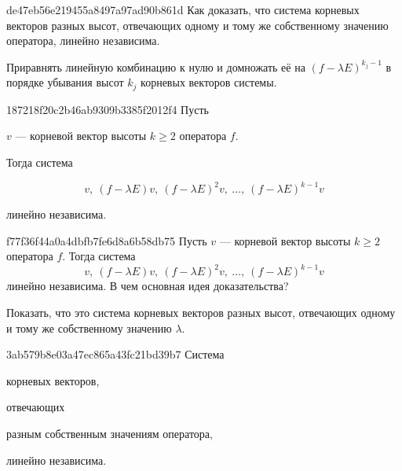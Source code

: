 \begin{note}{de47eb56e219455a8497a97ad90b861d}
    Как доказать, что система корневых векторов разных высот, отвечающих одному и тому же собственному значению оператора, линейно независима.

    \begin{cloze}{1}
        Приравнять линейную комбинацию к нулю и домножать её на \( (f - \lambda E)^{k_j - 1} \) в порядке убывания высот \( k_j \) корневых векторов системы.
    \end{cloze}
\end{note}

\begin{note}{187218f20c2b46ab9309b3385f2012f4}
    Пусть \begin{icloze}{3}\( v \) --- корневой вектор высоты \( k \geqslant 2 \) оператора \( f \).\end{icloze}
    Тогда система
    \begin{icloze}{2}
        \[
            v,\: (f - \lambda E) v,\: (f - \lambda E)^{2} v,\: \ldots,\: (f - \lambda E)^{k - 1} v
        \]
    \end{icloze}
    \begin{icloze}{1}линейно независима.\end{icloze}
\end{note}

\begin{note}{f77f36f44a0a4dbfb7fe6d8a6b58db75}
    Пусть \( v \) --- корневой вектор высоты \( k \geqslant 2 \) оператора \( f \).
    Тогда система
    \[
        v,\: (f - \lambda E) v,\: (f - \lambda E)^{2} v,\: \ldots,\: (f - \lambda E)^{k - 1} v
    \]
    линейно независима.
    В чем основная идея доказательства?

    \begin{cloze}{1}
        Показать, что это система корневых векторов разных высот, отвечающих одному и тому же собственному значению \( \lambda \).
    \end{cloze}
\end{note}

\begin{note}{3ab579b8e03a47ec865a43fc21bd39b7}
    Система \begin{icloze}{3}корневых векторов,\end{icloze} отвечающих \begin{icloze}{2}разным собственным значениям оператора,\end{icloze} \begin{icloze}{1}линейно независима.\end{icloze}
\end{note}

